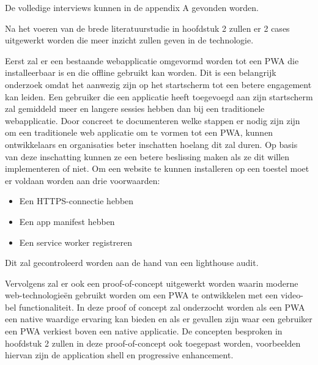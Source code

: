 De volledige interviews kunnen in de appendix A gevonden worden.

Na het voeren van de brede literatuurstudie in hoofdstuk 2 zullen er 2 cases uitgewerkt worden die meer inzicht zullen geven in de technologie.


Eerst zal er een bestaande webapplicatie omgevormd worden tot een PWA die installeerbaar is en die offline gebruikt kan worden.
Dit is een belangrijk onderzoek omdat het aanwezig zijn op het startscherm tot een betere engagement kan leiden. Een gebruiker die een applicatie heeft toegevoegd aan zijn startscherm zal gemiddeld meer en langere sessies hebben dan bij een traditionele webapplicatie.
\autocite{LePage2020b}
Door concreet te documenteren welke stappen er nodig zijn zijn om een traditionele web applicatie om te vormen tot een PWA, kunnen ontwikkelaars en organisaties beter inschatten hoelang dit zal duren.
Op basis van deze inschatting kunnen ze een betere beslissing maken als ze dit willen implementeren of niet.
Om een website te kunnen installeren op een toestel moet er voldaan worden aan drie voorwaarden:
\begin{itemize}
	\item Een HTTPS-connectie hebben
	\item Een app manifest hebben
	\item Een service worker registreren
\end{itemize}
Dit zal gecontroleerd worden aan de hand van een lighthouse audit.
	

Vervolgens zal er ook een proof-of-concept uitgewerkt worden waarin moderne web-technologieën gebruikt worden om een PWA te ontwikkelen met een video-bel functionaliteit. In deze proof of concept zal onderzocht worden als een PWA een native waardige ervaring kan bieden en als er gevallen zijn waar een gebruiker een PWA verkiest boven een native applicatie. De concepten besproken in hoofdstuk 2 zullen in deze proof-of-concept ook toegepast worden, voorbeelden hiervan zijn de application shell en  progressive enhancement.

